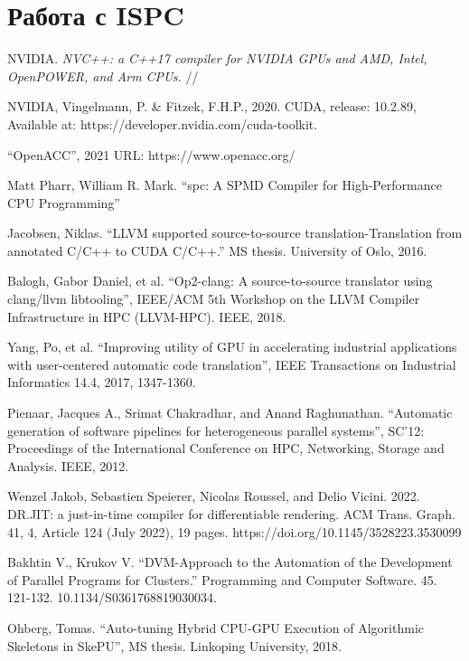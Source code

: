 \documentclass[11pt,fleqn,english,russian]{report} %
\begin{document}
\chapter{Работа с ISPC}


\begin{thebibliography}{10}
	
	 NVIDIA. \textit{NVC++: a C++17 compiler for NVIDIA GPUs and AMD, Intel, OpenPOWER, and Arm CPUs.} // 	
	
	 NVIDIA, Vingelmann, P. \& Fitzek, F.H.P., 2020. CUDA, release: 10.2.89, Available at: https://developer.nvidia.com/cuda-toolkit.	
	
	 ``OpenACC'', 2021 URL: https://www.openacc.org/
	
	 Matt Pharr, William R. Mark. ``spc: A SPMD Compiler for High-Performance CPU Programming''
	
	 Jacobsen, Niklas. ``LLVM supported source-to-source translation-Translation from annotated C/C++ to CUDA C/C++.'' MS thesis. University of Oslo, 2016. 
	
	 Balogh, Gabor Daniel, et al. ``Op2-clang: A source-to-source translator using clang/llvm libtooling'', IEEE/ACM 5th Workshop on the LLVM Compiler Infrastructure in HPC (LLVM-HPC). IEEE, 2018. 
	
	 Yang, Po, et al. ``Improving utility of GPU in accelerating industrial applications with user-centered automatic code translation'', IEEE Transactions on Industrial Informatics 14.4, 2017, 1347-1360. 
	
	 Pienaar, Jacques A., Srimat Chakradhar, and Anand Raghunathan. ``Automatic generation of software pipelines for heterogeneous parallel systems'', SC'12: Proceedings of the International Conference on HPC, Networking, Storage and Analysis. IEEE, 2012. 	
	
	 Wenzel Jakob, Sebastien Speierer, Nicolas Roussel, and Delio Vicini. 2022. DR.JIT: a just-in-time compiler for differentiable rendering. ACM Trans. Graph. 41, 4, Article 124 (July 2022), 19 pages. https://doi.org/10.1145/3528223.3530099
	
	 Bakhtin V., Krukov V. ``DVM-Approach to the Automation of the Development of Parallel Programs for Clusters.'' Programming and Computer Software. 45. 121-132. 10.1134/S0361768819030034. 
	
	 Ohberg, Tomas. ``Auto-tuning Hybrid CPU-GPU Execution of Algorithmic Skeletons in SkePU'', MS thesis. Linkoping University, 2018.	
	

\end{thebibliography}
\end{document}
